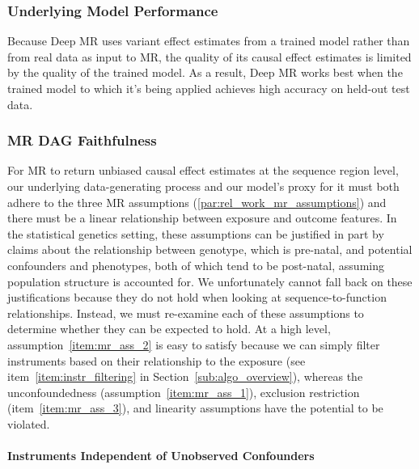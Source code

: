 \subsubsection{Underlying Model Performance}%
\label{ssub:underlying_model_performance}
Because Deep MR uses variant effect estimates from a trained model rather than from real data as input to MR, the quality of its causal effect estimates is limited by the quality of the trained model. As a result, Deep MR works best when the trained model to which it's being applied achieves high accuracy on held-out test data.


\subsubsection{MR DAG Faithfulness}%
\label{ssub:mr_dag_faithfulness}
For MR to return unbiased causal effect estimates at the sequence region level, our underlying data-generating process and our model's proxy for it must both adhere to the three MR assumptions (\ref{par:rel_work_mr_assumptions}) and there must be a linear relationship between exposure and outcome features. In the statistical genetics setting, these assumptions can be justified in part by claims about the relationship between genotype, which is pre-natal, and potential confounders and phenotypes, both of which tend to be post-natal, assuming population structure is accounted for. We unfortunately cannot fall back on these justifications because they do not hold when looking at sequence-to-function relationships. Instead, we must re-examine each of these assumptions to determine whether they can be expected to hold. At a high level, assumption~\ref{item:mr_ass_2} is easy to satisfy because we can simply filter instruments based on their relationship to the exposure (see item~\ref{item:instr_filtering} in Section~\ref{sub:algo_overview}), whereas the unconfoundedness (assumption~\ref{item:mr_ass_1}), exclusion restriction (item~\ref{item:mr_ass_3}), and linearity assumptions have the potential to be violated.

\paragraph{Instruments Independent of Unobserved Confounders}%
\label{par:meth_instr_ind_conf}

